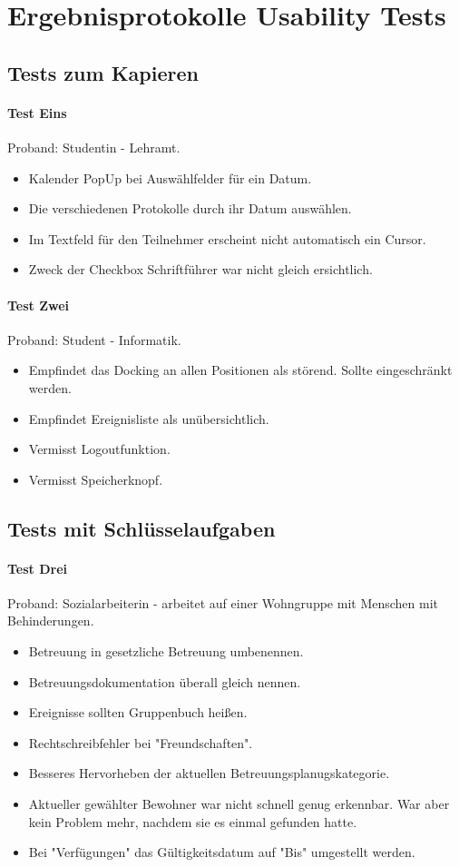 \section{Ergebnisprotokolle Usability Tests}
\subsection{Tests zum Kapieren}
\paragraph*{Test Eins}
Proband: Studentin - Lehramt. 
\begin{itemize}
	\item Kalender PopUp bei Auswählfelder für ein Datum.
	\item Die verschiedenen Protokolle durch ihr Datum auswählen.
	\item Im Textfeld für den Teilnehmer erscheint nicht automatisch ein Cursor.
	\item Zweck der Checkbox Schriftführer war nicht gleich ersichtlich.

\end{itemize}

\paragraph*{Test Zwei}
Proband: Student - Informatik. 
\begin{itemize}
	\item Empfindet das Docking an allen Positionen als störend. Sollte eingeschränkt werden.
	\item Empfindet Ereignisliste als unübersichtlich.
	\item Vermisst Logoutfunktion.
	\item Vermisst Speicherknopf.
\end{itemize}

\subsection{Tests mit Schlüsselaufgaben}
\paragraph*{Test Drei}
Proband: Sozialarbeiterin - arbeitet auf einer Wohngruppe mit Menschen mit Behinderungen. 
\begin{itemize}
	\item Betreuung in gesetzliche Betreuung umbenennen. 
	\item Betreuungsdokumentation überall gleich nennen.
	\item Ereignisse sollten Gruppenbuch heißen.
	\item Rechtschreibfehler bei "Freundschaften".
	\item Besseres Hervorheben der aktuellen Betreuungsplanugskategorie.
	\item Aktueller gewählter Bewohner war nicht schnell genug erkennbar. War aber kein Problem mehr, nachdem sie es einmal gefunden hatte.
	\item Bei "Verfügungen" das Gültigkeitsdatum auf "Bis" umgestellt werden.
\end{itemize}

